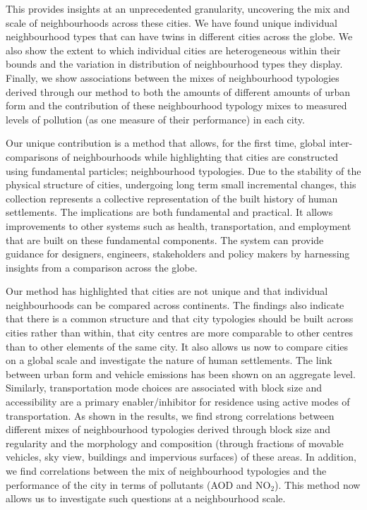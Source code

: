 This provides insights at an unprecedented granularity, uncovering the mix and scale of neighbourhoods across these cities. We have found unique individual neighbourhood types that can have twins in different cities across the globe. We also show the extent to which individual cities are heterogeneous within their bounds and the variation in distribution of neighbourhood types they display. Finally, we show associations between the mixes of neighbourhood typologies derived through our method to both the amounts of different amounts of urban form and the contribution of these neighbourhood typology mixes to measured levels of pollution (as one measure of their performance) in each city. 

Our unique contribution is a method that allows, for the first time, global inter-comparisons of neighbourhoods while highlighting that cities are constructed using fundamental particles; neighbourhood typologies. Due to the stability of the physical structure of cities, undergoing long term small incremental changes\cite{Wegener1986}, this collection represents a collective representation of the built history of human settlements. The implications are both fundamental and practical. It allows improvements to other systems such as health, transportation, and employment that are built on these fundamental components. The system can provide guidance for designers, engineers, stakeholders and policy makers by harnessing insights from a comparison across the globe. 

Our method has highlighted that cities are not unique and that individual neighbourhoods can be compared across continents. The findings also indicate that there is a common structure and that city typologies should be built across cities rather than within, that city centres are more comparable to other centres than to other elements of the same city. It also allows us now to compare cities on a global scale and investigate the nature of human settlements. The link between urban form and vehicle emissions has been shown on an aggregate level\cite{Frank2000}. Similarly, transportation mode choices are associated with block size and accessibility are a primary enabler/inhibitor for residence using active modes of transportation\cite{Ewing2001,Ewing2009a}. As shown in the results, we find strong correlations between different mixes of neighbourhood typologies derived through block size and regularity and the morphology and composition (through fractions of movable vehicles, sky view, buildings and impervious surfaces) of these areas. In addition, we find correlations between the mix of neighbourhood typologies and the performance of the city in terms of pollutants (AOD and NO$_{2}$). This method now allows us to investigate such questions at a neighbourhood scale. 

